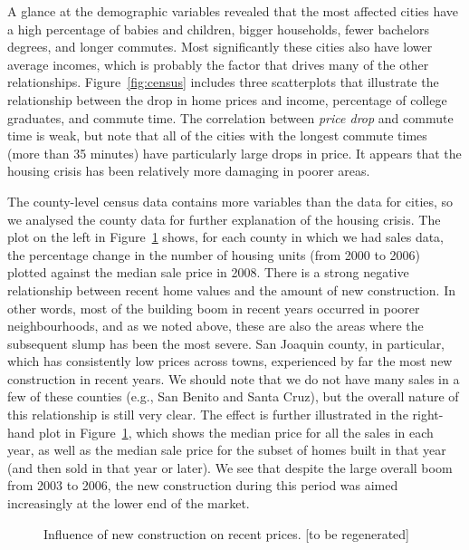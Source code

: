 \documentclass[oneside]{article}
\begin{document}
A glance at the demographic variables revealed that the most affected cities have a high percentage of babies and children, bigger households, fewer bachelors degrees, and longer commutes.  Most significantly these cities also have lower average incomes, which is probably the factor that drives many of the other relationships. Figure~\ref{fig:census} includes three scatterplots that illustrate the relationship between the drop in home prices and income, percentage of college graduates, and commute time.  The correlation between {\em price drop} and commute time is weak, but note that all of the cities with the longest commute times (more than 35 minutes) have particularly large drops in price. It appears that the housing crisis has been relatively more damaging in poorer areas.

The county-level census data contains more variables than the data for cities, so we analysed the county data for further explanation of the housing crisis. The plot on the left in Figure~\ref{fig:newconstruct} shows, for each county in which we had sales data, the percentage change in the number of housing units (from 2000 to 2006) plotted against the median sale price in 2008. There is a strong negative relationship between recent home values and the amount of new construction. In other words, most of the building boom in recent years occurred in poorer neighbourhoods, and as we noted above, these are also the areas where the subsequent slump has been the most severe. San Joaquin county, in particular, which has consistently low prices across towns, experienced by far the most new construction in recent years.  We should note that we do not have many sales in a few of these counties (e.g., San Benito and Santa Cruz), but the overall nature of this relationship is still very clear. The effect is further illustrated in the right-hand plot in Figure~\ref{fig:newconstruct}, which shows the median price for all the sales in each year, as well as the median sale price for the subset of homes built in that year (and then sold in that year or later). We see that despite the large overall boom from 2003 to 2006, the new construction during this period was aimed increasingly at the lower end of the market.  

\begin{figure}[htbp]
  \centering
  \caption{Influence of new construction on recent prices. [to be regenerated]}
  \label{fig:newconstruct}
\end{figure}
\end{document}
